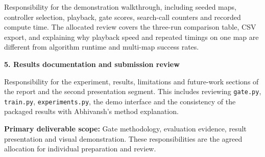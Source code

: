 {Responsibility for the demonstration walkthrough, including seeded maps, controller selection, playback, gate scores, search-call counters and recorded compute time. The allocated review covers the three-run comparison table, CSV export, and explaining why playback speed and repeated timings on one map are different from algorithm runtime and multi-map success rates.

\textbf{5. Results documentation and submission review}

Responsibility for the experiment, results, limitations and future-work sections of the report and the second presentation segment. This includes reviewing \texttt{gate.py}, \texttt{train.py}, \texttt{experiments.py}, the demo interface and the consistency of the packaged results with Abhivansh's method explanation.

\textbf{Primary deliverable scope:} Gate methodology, evaluation evidence, result presentation and visual demonstration. These responsibilities are the agreed allocation for individual preparation and review.
}
